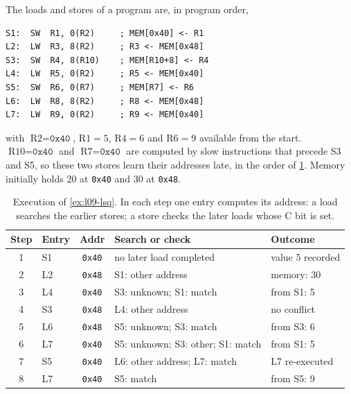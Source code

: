 \documentclass[../main.tex]{subfiles}
\begin{document}
\begin{example}
  \label{ex:l09-lsq}
  The loads and stores of a program are, in program order,
  \begin{lstlisting}[language={[x86masm]Assembler}, numbers=none]
S1:  SW  R1, 0(R2)     ; MEM[0x40] <- R1
L2:  LW  R3, 8(R2)     ; R3 <- MEM[0x48]
S3:  SW  R4, 8(R10)    ; MEM[R10+8] <- R4
L4:  LW  R5, 0(R2)     ; R5 <- MEM[0x40]
S5:  SW  R6, 0(R7)     ; MEM[R7] <- R6
L6:  LW  R8, 8(R2)     ; R8 <- MEM[0x48]
L7:  LW  R9, 0(R2)     ; R9 <- MEM[0x40]
\end{lstlisting}
  with $\text{R2} = \texttt{0x40}$, $\text{R1}=5$, $\text{R4}=6$ and
  $\text{R6}=9$ available from the start.  $\text{R10} = \texttt{0x40}$ and
  $\text{R7}=\texttt{0x40}$ are computed by slow instructions that precede S3
  and S5, so these two stores learn their addresses late, in the order of
  \cref{tab:l09-trace}.  Memory initially holds 20 at \texttt{0x40} and 30 at
  \texttt{0x48}.
\end{example}

\begin{table}[htbp]
  \centering\small
  \caption{Execution of \cref{ex:l09-lsq}.  In each step one entry computes
    its address: a load searches the earlier stores; a store checks the later
    loads whose C bit is set.}
  \label{tab:l09-trace}
  \begin{tabular}{@{}clcll@{}}
    \toprule
    Step & Entry & Addr & Search or check & Outcome \\
    \midrule
    1 & S1 & \texttt{0x40} & no later load completed & value 5 recorded \\
    2 & L2 & \texttt{0x48} & S1: other address & memory: 30 \\
    3 & L4 & \texttt{0x40} & S3: unknown; S1: match & from S1: 5 \\
    4 & S3 & \texttt{0x48} & L4: other address & no conflict \\
    5 & L6 & \texttt{0x48} & S5: unknown; S3: match & from S3: 6 \\
    6 & L7 & \texttt{0x40} & S5: unknown; S3: other; S1: match & from S1: 5 \\
    7 & S5 & \texttt{0x40} & L6: other address; L7: match & L7 re-executed \\
    8 & L7 & \texttt{0x40} & S5: match & from S5: 9 \\
    \bottomrule
  \end{tabular}
\end{table}
\end{document}
